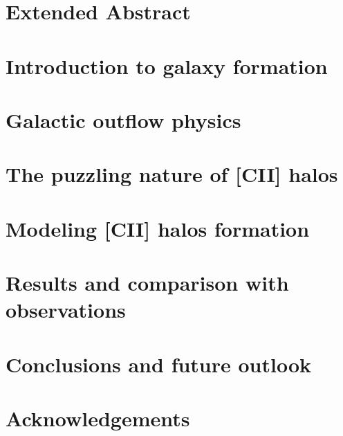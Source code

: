 \documentclass[a4paper, 12pt, openany, oneside]{book}
\begin{document}







\chapter*{Extended Abstract}



\chapter{Introduction to galaxy formation} \label{chap:intro}
\vspace{20pt}


\chapter{Galactic outflow physics} \label{chap:outflows}
\vspace{20pt}


\chapter{The puzzling nature of [CII] halos} \label{chap:halos}
\vspace{20pt}



\chapter{Modeling [CII] halos formation} \label{chap:model}
\vspace{20pt}


\chapter{Results and comparison with observations} \label{chap:results}
\vspace{20pt}


\chapter{Conclusions and future outlook}
\vspace{20pt}
\label{chap:conclusion}



\chapter{Acknowledgements}
\vspace{20pt}
\label{chap:acknowledgements}





\end{document}
